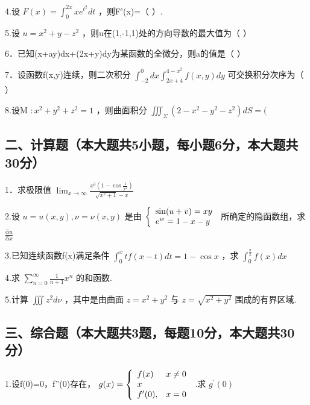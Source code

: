 \documentclass[11pt,fontset=fandol]{ctexart}
\begin{document}
4.设 \(F ( x ) = \int _ { 0 } ^ { 2 x } x e ^ { t ^ { 2 } } d t\)
，则F'(x)=（ ）.

5.设 \(u = x ^ { 2 } + y - z ^ { 2 }\)
，则u在(1,-1,1)处的方向导数的最大值为（ ）

6．已知(x+ay)dx+(2x+y)dy为某函数的全微分，则a的值是（ ）

7．设函数f(x,y)连续，则二次积分
\(\int _ { - 2 } ^ { 0 } d x \int _ { 2 x + 4 } ^ { 4 - x ^ { 2 } } f ( x , y ) d y\)
可交换积分次序为（ ）

8.设M \(: x ^ { 2 } + y ^ { 2 } + z ^ { 2 } = 1\) ，则曲面积分
\(\iiint _ { \Sigma } ( 2 - x ^ { 2 } - y ^ { 2 } - z ^ { 2 } ) d S = (\)

\subsection{二、计算题（本大题共5小题，每小题6分，本大题共30分）}\label{ux4e8cux8ba1ux7b97ux9898ux672cux5927ux9898ux51715ux5c0fux9898ux6bcfux5c0fux98986ux5206ux672cux5927ux9898ux517130ux5206}

1．求极限值
\(\lim _ { x \to \infty } { \frac { x ^ { 3 } ( 1 - \cos { \frac { 1 } { x ^ { 2 } } } ) } { \sqrt { x ^ { 2 } + 1 } - x } }\)

2.设 \(u = u ( x , y ) , \nu = \nu ( x , y )\) 是由
\(\left\{ \begin{array} { l l } { \sin ( u + v ) = x y } \\ { e ^ { w } = 1 - x - y } \end{array} \right.\)
所确定的隐函数组，求
\(\frac { \hat { \alpha } u } { \hat { \alpha } x }\)

3.已知连续函数f(x)满足条件
\(\int _ { 0 } ^ { x } t f ( x - t ) d t = 1 - \cos x\) ，求
\(\int _ { 0 } ^ { \frac { \pi } { 2 } } f ( x ) d x\)

4.求
\(\scriptstyle \sum _ { n = 0 } ^ { \infty } { \frac { 1 } { n + 1 } } x ^ { n }\)
的和函数.

5.计算 \(\iiint z ^ { 2 } d \nu\) ，其中是由曲面
\(z = x ^ { 2 } + y ^ { 2 }\) 与 \(z = \sqrt { x ^ { 2 } + y ^ { 2 } }\)
围成的有界区域.

\subsection{三、综合题（本大题共3题，每题10分，本大题共30分）}\label{ux4e09ux7efcux5408ux9898ux672cux5927ux9898ux51713ux9898ux6bcfux989810ux5206ux672cux5927ux9898ux517130ux5206}

1.设f(0)=0，f''(0)存在，
\(g ( x ) = \left\{ { \begin{array} { l l } { { f ( x ) } } & { { x \not = 0 } } \\ { { x } } & { { } } \\ { { f ^ { \prime } ( 0 ) , } } & { { x = 0 } } \end{array} } \right.\)
.求 \(g ^ { \prime } ( 0 )\)
\end{document}
